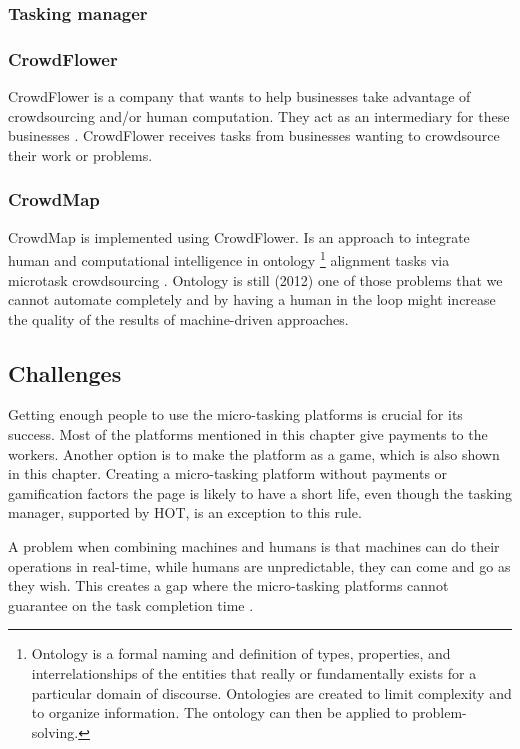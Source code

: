 \subsubsection{Tasking manager}

\subsubsection{CrowdFlower}  
CrowdFlower is a company that wants to help businesses take advantage of crowdsourcing and/or human computation. They act as an intermediary for these businesses \citep{Quinn2011}. CrowdFlower receives tasks from businesses wanting to crowdsource their work or problems. 

\subsubsection{CrowdMap}
CrowdMap is implemented using CrowdFlower. 
Is an approach to integrate human and computational intelligence in ontology \footnote{\label{ontology} Ontology is a formal naming and definition of types, properties, and interrelationships of the entities that really or fundamentally exists for a particular domain of discourse. Ontologies are created to limit complexity and to organize information. The ontology can then be applied to problem-solving. } alignment tasks via microtask crowdsourcing \citep{Sarasua2012}. Ontology is still (2012) one of those problems that we cannot automate completely and by having a human in the loop might increase the quality of the results of machine-driven approaches. 

\subsection{Challenges}
Getting enough people to use the micro-tasking platforms is crucial for its success. Most of the platforms mentioned in this chapter give payments to the workers. Another option is to make the platform as a game, which is also shown in this chapter. Creating a micro-tasking platform without payments or gamification factors the page is likely to have a short life, even though the tasking manager, supported by HOT, is an exception to this rule. 

A problem when combining machines and humans is that machines can do their operations in real-time, while humans are unpredictable, they can come and go as they wish. This creates a gap where the micro-tasking platforms cannot guarantee on the task completion time \citep{Difallah2016}. 

